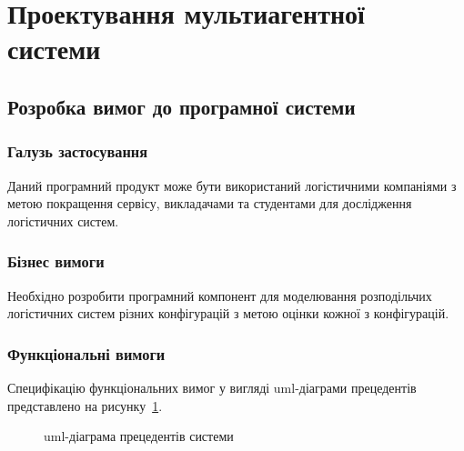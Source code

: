 \section{Проектування мультиагентної системи}
\subsection{Розробка вимог до програмної системи}
\subsubsection{Галузь застосування}
Даний програмний продукт може бути використаний логістичними компаніями з метою покращення сервісу, викладачами та студентами для дослідження логістичних систем.

\subsubsection{Бізнес вимоги}
Необхідно розробити програмний компонент для моделювання розподільчих логістичних систем різних конфігурацій з метою оцінки кожної з конфігурацій.

\subsubsection{Функціональні вимоги}
Специфікацію функціональних вимог у вигляді \acrshort{uml}-діаграми прецедентів представлено на рисунку~\ref{fig:system_usecase}.

\begin{figure}[H]
	\centering


	\caption{\acrshort{uml}-діаграма прецедентів системи}
	\label{fig:system_usecase}
\end{figure}

